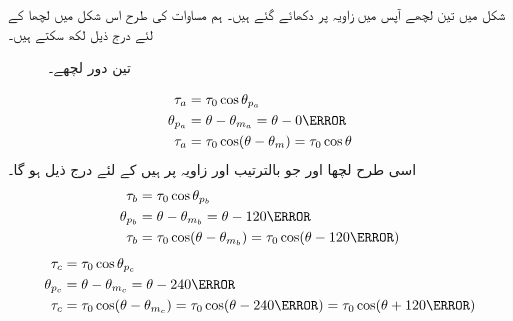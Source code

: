  شکل   میں تین لچھے آپس میں  زاویہ پر دکھائے گئے ہیں۔ ہم مساوات    کی طرح اس شکل میں لچھا   کے لئے درج ذیل لکھ سکتے ہیں۔
\begin{figure}
\centering
\caption{تین دور لچھے۔}
\label{شکل_گھومتے_مشین_تین_دور_لچھے}
\end{figure}
%
\begin{gather}
\begin{aligned}\label{مساوات_گھومتے_مشین_الف_موج}
\tau_a&=\tau_0 \cos \theta_{p_a}\\
\theta_{p_a}&=\theta-\theta_{m_a}=\theta-0\degree\\
\tau_a&=\tau_0 \cos (\theta-\theta_m)=\tau_0 \cos \theta
\end{aligned}
\end{gather}
اسی طرح لچھا  اور  جو بالترتیب  اور   زاویہ پر ہیں کے لئے درج ذیل ہو گا۔
\begin{gather}
\begin{aligned}\label{مساوات_گھومتے_مشین_ب_موج}
\tau_b&=\tau_0 \cos \theta_{p_b}\\
\theta_{p_b}&=\theta-\theta_{m_b}=\theta-120\degree\\
\tau_b&=\tau_0 \cos (\theta-\theta_{m_b})=\tau_0 \cos (\theta-120\degree)
\end{aligned}
\end{gather}
%
\begin{gather}
\begin{aligned}\label{مساوات_گھومتے_مشین_پ_موج}
\tau_c&=\tau_0 \cos \theta_{p_c}\\
\theta_{p_c}&=\theta-\theta_{m_c}=\theta-240\degree\\
\tau_c&=\tau_0 \cos (\theta-\theta_{m_c})=\tau_0 \cos (\theta-240\degree)=\tau_0 \cos (\theta+120\degree)
\end{aligned}
\end{gather}

